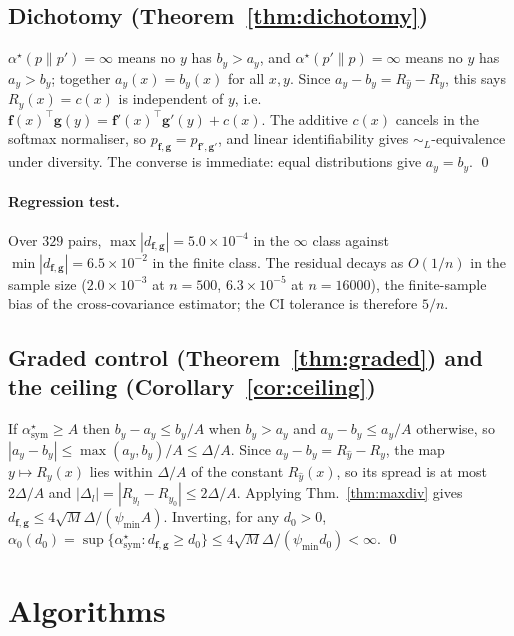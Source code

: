 \documentclass[10pt,letterpaper,twocolumn]{article}
\newcommand{\bff}{\mathbf{f}}
\newcommand{\bfg}{\mathbf{g}}
\newcommand{\dfg}{d_{\bff,\bfg}}
\newcommand{\simL}{\sim_{L}}
\theoremstyle{plain}
\theoremstyle{definition}
\theoremstyle{remark}
\begin{document}
\subsection{Dichotomy (Theorem~\ref{thm:dichotomy})}

$\alpha^{\star}(p\|p')=\infty$ means no $y$ has $b_{y}>a_{y}$, and
$\alpha^{\star}(p'\|p)=\infty$ means no $y$ has $a_{y}>b_{y}$; together
$a_{y}(x)=b_{y}(x)$ for all $x,y$. Since $a_{y}-b_{y}=R_{\hat y}-R_{y}$, this
says $R_{y}(x)=c(x)$ is independent of $y$, i.e.
$\bff(x)^{\top}\bfg(y)=\bff'(x)^{\top}\bfg'(y)+c(x)$. The additive $c(x)$
cancels in the softmax normaliser, so $p_{\bff,\bfg}=p_{\bff',\bfg'}$, and
linear identifiability gives $\simL$-equivalence under diversity. The converse
is immediate: equal distributions give $a_{y}=b_{y}$. \qed

\paragraph{Regression test.}
Over $329$ pairs, $\max|\dfg|=5.0\times10^{-4}$ in the $\infty$ class against
$\min|\dfg|=6.5\times10^{-2}$ in the finite class. The residual decays as
$O(1/n)$ in the sample size ($2.0\times10^{-3}$ at $n=500$,
$6.3\times10^{-5}$ at $n=16000$), the finite-sample bias of the
cross-covariance estimator; the CI tolerance is therefore $5/n$.

\subsection{Graded control (Theorem~\ref{thm:graded}) and the ceiling
(Corollary~\ref{cor:ceiling})}

If $\alpha^{\star}_{\mathrm{sym}}\ge A$ then $b_{y}-a_{y}\le b_{y}/A$ when
$b_{y}>a_{y}$ and $a_{y}-b_{y}\le a_{y}/A$ otherwise, so
$|a_{y}-b_{y}|\le\max(a_{y},b_{y})/A\le\Delta/A$. Since
$a_{y}-b_{y}=R_{\hat y}-R_{y}$, the map $y\mapsto R_{y}(x)$ lies within
$\Delta/A$ of the constant $R_{\hat y}(x)$, so its spread is at most
$2\Delta/A$ and $|\Delta_{l}|=|R_{y_{l}}-R_{y_{0}}|\le2\Delta/A$. Applying
Thm.~\ref{thm:maxdiv} gives $\dfg\le4\sqrt{M}\Delta/(\psi_{\min}A)$.
Inverting, for any $d_{0}>0$,
$\alpha_{0}(d_{0})=\sup\{\alpha^{\star}_{\mathrm{sym}}:\dfg\ge d_{0}\}
\le4\sqrt{M}\Delta/(\psi_{\min}d_{0})<\infty$. \qed

\section{Algorithms}
\label{app:alg}
\end{document}
